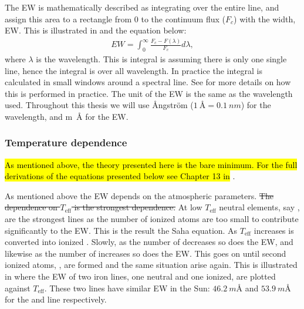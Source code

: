 The EW is mathematically described as integrating over the entire line, and assign this area to a
rectangle from 0 to the continuum flux ($F_c$) with the width, EW. This is illustrated in
 and the equation below: \begin{align} EW = \int_{0}^{\infty}
\frac{F_c-F(\lambda)}{F_c} d\lambda, \end{align} where $\lambda$ is the wavelength. This is integral
is assuming there is only one single line, hence the integral is over all wavelength. In practice
the integral is calculated in small windows around a spectral line. See  for
more details on how this is performed in practice. The unit of the EW is the same as the wavelength
used. Throughout this thesis we will use \AA{}ngstr\"{o}m ($\SI{1}{\angstrom}=\SI{0.1}{nm}$) for the
wavelength, and \si{m\angstrom} for the EW.


\subsubsection{Temperature dependence}

\hl{As mentioned above, the theory presented here is the bare minimum. For the full derivations of
the equations presented below see Chapter 13 in} \citet{Gray2006}.

As mentioned above the EW depends on the atmospheric parameters. \st{The dependence on
$T_\mathrm{eff}$ is the strongest dependence.} At low $T_\mathrm{eff}$ neutral elements, say
, are the strongest lines as the number of ionized atoms are too small to contribute
significantly to the EW. This is the result the Saha equation. As $T_\mathrm{eff}$ increases
 is converted into ionized . Slowly, as the number of  decreases
so does the EW, and likewise as the number of  increases so does the EW. This goes on
until second ionized atoms, , are formed and the same situation arise again. This is
illustrated in  where the EW of two iron lines, one neutral and one ionized, are
plotted against $T_\mathrm{eff}$. These two lines have similar EW in the Sun:
$\SI{46.2}{m\angstrom}$ and $\SI{53.9}{m\angstrom}$ for the  and  line
respectively.

